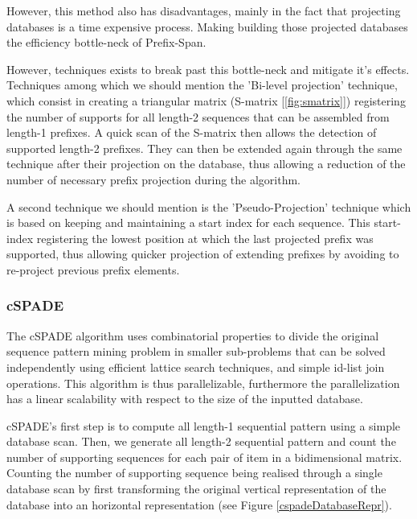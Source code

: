 \documentclass{eplmastersthesis}
\begin{document}
However, this method also has disadvantages, mainly in the fact that projecting databases is a time expensive process. Making building those projected databases the efficiency bottle-neck of Prefix-Span. \newline

However, techniques exists to break past this bottle-neck and mitigate it's effects. Techniques among which we should mention the 'Bi-level projection' technique, which consist in creating a triangular matrix (S-matrix [\ref{fig:smatrix}]) registering the number of supports for all length-2 sequences that can be assembled from length-1 prefixes. A quick scan of the S-matrix then allows the detection of supported length-2 prefixes. They can then be extended again through the same technique after their projection on the database, thus allowing a reduction of the number of necessary prefix projection during the algorithm. \newline

A second technique we should mention is the 'Pseudo-Projection' technique which is based on keeping and maintaining a start index for each sequence. This start-index registering the lowest position at which the last projected prefix was supported, thus allowing quicker projection of extending prefixes by avoiding to re-project previous prefix elements.
\subsubsection{cSPADE}

The cSPADE algorithm \cite{zaki2001spade} uses combinatorial properties to divide the original sequence pattern mining problem in smaller sub-problems that can be solved independently using efficient lattice search techniques, and simple id-list join
operations. This algorithm is thus parallelizable, furthermore the parallelization has a linear scalability with respect to the size of the inputted database. \newline

cSPADE's first step is to compute all length-1 sequential pattern using a simple database scan. Then, we generate all length-2 sequential pattern and count the number of supporting sequences for each pair of item in a bidimensional matrix. Counting the number of supporting sequence being realised through a single database scan by first transforming the original vertical representation of the database into an horizontal representation (see Figure \ref{cspadeDatabaseRepr}).
\end{document}
